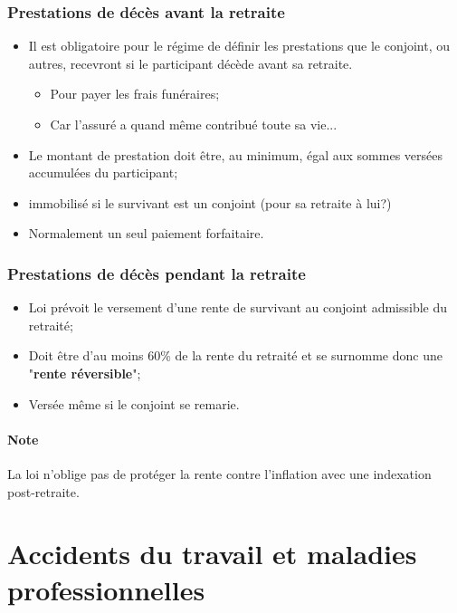 \documentclass[10pt, french]{article}
\begin{document}
\begin{multicols*}{3}
\subsubsection*{Prestations de décès avant la retraite}
\begin{itemize}[leftmargin = *]
	\item	Il est obligatoire pour le régime de définir les prestations que le conjoint, ou autres, recevront si le participant décède avant sa retraite.
	\begin{itemize}
	\item	Pour payer les frais funéraires;
	\item 	Car l'assuré a quand même contribué toute sa vie...
	\end{itemize}
	\item	Le montant de prestation doit être, au minimum, égal aux sommes versées accumulées du participant;
	\item	immobilisé si le survivant est un conjoint (pour sa retraite à lui?)
	\item	Normalement un seul paiement forfaitaire.
\end{itemize}

\subsubsection*{Prestations de décès pendant la retraite}
\begin{itemize}[leftmargin = *]
	\item	Loi prévoit le versement d'une rente de survivant au conjoint admissible du retraité;
	\item	Doit être d'au moins 60\% de la rente du retraité et se surnomme donc une "\textbf{rente réversible}";
	\item	Versée même si le conjoint se remarie.
\end{itemize}

\paragraph{Note}	La loi n'oblige pas de protéger la rente contre l'inflation avec une indexation post-retraite.


\newpage
\section{Accidents du travail et maladies professionnelles}


\end{multicols*}
\end{document}
